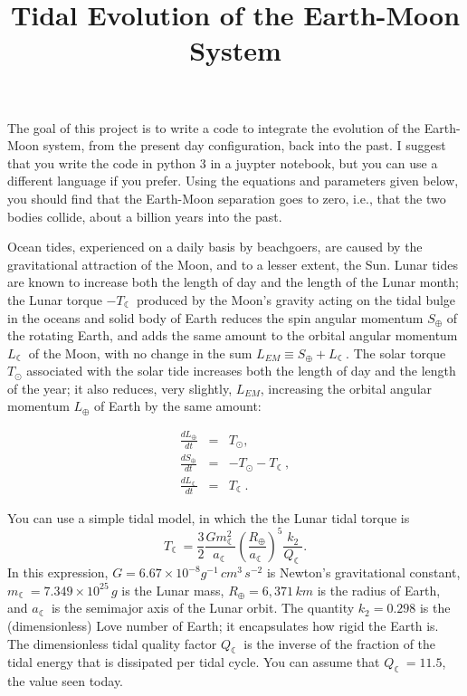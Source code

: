 \documentclass[12pt]{article}
\title{Tidal Evolution of the Earth-Moon System}
\date{}
\begin{document}
 

\baselineskip24pt

\maketitle 

The goal of this project is to write a code to integrate the evolution of the Earth-Moon system, from the present day configuration, back into the past. I suggest that you write the code in python 3 in a juypter notebook, but you can use a different language if you prefer. Using the equations and parameters given below, you should find that the Earth-Moon separation goes to zero, i.e., that the two bodies collide, about a billion years into the past. 

Ocean tides, experienced on a daily basis by beachgoers, are caused by the gravitational attraction of the Moon, and to a lesser extent, the Sun. Lunar tides are known to increase both the length of day and the length of the Lunar month; the Lunar torque $-T_{\leftmoon}$ produced by the Moon's gravity acting on the tidal bulge in the oceans and solid body of Earth reduces the spin angular momentum $S_\oplus$ of the rotating Earth, and adds the same amount to the orbital angular momentum $L_{\leftmoon}$ of the Moon, with no change in the sum $L_{EM}\equiv S_\oplus+L_{\leftmoon}$. The solar torque $T_\odot$ associated with the solar tide increases both the length of day and the length of the year; it also reduces, very slightly, $L_{EM}$, increasing the orbital angular momentum $L_\oplus$ of Earth by the same amount:

%
\begin{eqnarray}
\frac{dL_\oplus}{dt} &=& T_\odot,\\
\frac{dS_\oplus}{dt} &=& -T_\odot-T_{\leftmoon},\\
\frac{dL_{\leftmoon}}{dt} &=& T_{\leftmoon}.
\end{eqnarray}
%

You can use a simple tidal model, in which the the Lunar tidal torque is 
\begin{equation}
  T_{\leftmoon} = \frac{3}{2}\frac{G m^2_{\leftmoon}}{a_{\leftmoon}}\left(\frac{R_\oplus}{a_{\leftmoon}}\right)^5
  \frac{k_2}{Q_{\leftmoon}}.
\end{equation}
In this expression, $G=6.67\times10^{-8}g^{-1}\,cm^3\, s^{-2}$ is Newton's gravitational constant,  $m_{\leftmoon}=7.349\times10^{25}\, g$ is the Lunar mass, $R_\oplus=6,371\, km$ is the radius of Earth, and $a_{\leftmoon}$ is the semimajor axis of the Lunar orbit.  The quantity $k_2=0.298$ is the (dimensionless) Love number of Earth; it encapsulates how rigid the Earth is. The dimensionless tidal quality factor $Q_{\leftmoon}$  is the inverse of the fraction of the tidal energy that is dissipated per tidal cycle. You can assume that $Q_{\leftmoon}=11.5$, the value seen today.
\end{document}
